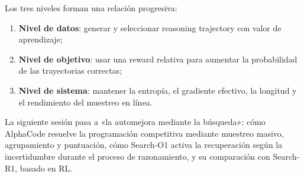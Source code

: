 \documentclass[a4paper]{article}
\begin{document}
Los tres niveles forman una relación progresiva:

\begin{enumerate}
    \item \textbf{Nivel de datos}: generar y seleccionar reasoning trajectory con valor de aprendizaje;
    \item \textbf{Nivel de objetivo}: usar una reward relativa para aumentar la probabilidad de las trayectorias correctas;
    \item \textbf{Nivel de sistema}: mantener la entropía, el gradiente efectivo, la longitud y el rendimiento del muestreo en línea.
\end{enumerate}

La siguiente sesión pasa a «la automejora mediante la búsqueda»: cómo AlphaCode resuelve la programación competitiva mediante muestreo masivo, agrupamiento y puntuación, cómo Search-O1 activa la recuperación según la incertidumbre durante el proceso de razonamiento, y su comparación con Search-R1, basado en RL.
\end{document}
